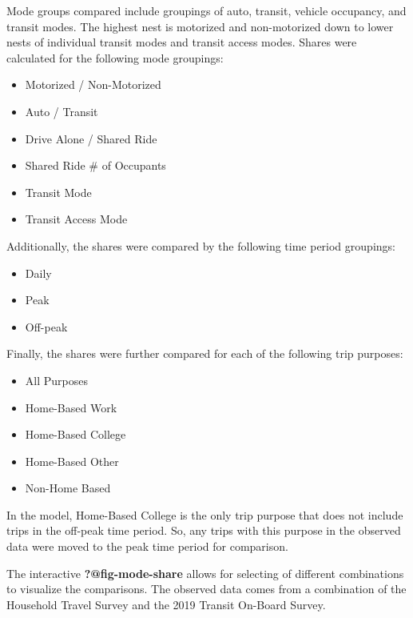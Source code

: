 \documentclass[
  letterpaper,
  DIV=11,
  numbers=noendperiod]{scrreprt}
\providecommand{\tightlist}{%
  \setlength{\itemsep}{0pt}\setlength{\parskip}{0pt}}\usepackage{longtable,booktabs,array}
\begin{document}
Mode groups compared include groupings of auto, transit, vehicle
occupancy, and transit modes. The highest nest is motorized and
non-motorized down to lower nests of individual transit modes and
transit access modes. Shares were calculated for the following mode
groupings:

\begin{itemize}
\tightlist
\item
  Motorized / Non-Motorized
\item
  Auto / Transit
\item
  Drive Alone / Shared Ride
\item
  Shared Ride \# of Occupants
\item
  Transit Mode
\item
  Transit Access Mode
\end{itemize}

Additionally, the shares were compared by the following time period
groupings:

\begin{itemize}
\tightlist
\item
  Daily
\item
  Peak
\item
  Off-peak
\end{itemize}

Finally, the shares were further compared for each of the following trip
purposes:

\begin{itemize}
\tightlist
\item
  All Purposes
\item
  Home-Based Work
\item
  Home-Based College
\item
  Home-Based Other
\item
  Non-Home Based
\end{itemize}

In the model, Home-Based College is the only trip purpose that does not
include trips in the off-peak time period. So, any trips with this
purpose in the observed data were moved to the peak time period for
comparison.

The interactive \textbf{?@fig-mode-share} allows for selecting of
different combinations to visualize the comparisons. The observed data
comes from a combination of the Household Travel Survey and the 2019
Transit On-Board Survey.
\end{document}

